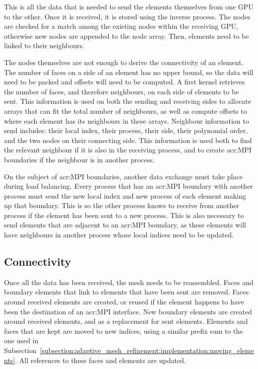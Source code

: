 This is all the data that is needed to send the elements themselves from one GPU to the other. Once
it is received, it is stored using the inverse process. The nodes are checked for a match among the
existing nodes within the receiving GPU, otherwise new nodes are appended to the node array. Then,
elements need to be linked to their neighbours. 

The nodes themselves are not enough to derive the connectivity of an element. The number of faces on
a side of an element has no upper bound, so the data will need to be packed and offsets will need to
be computed. A first kernel retrieves the number of faces, and therefore neighbours, on each side of
elements to be sent. This information is used on both the sending and receiving sides to allocate
arrays that can fit the total number of neighbours, as well as compute offsets to where each element
has its neighbours in these arrays. Neighbour information to send includes: their local index, their
process, their side, their polynomial order, and the two nodes on their connecting side. This
information is used both to find the relevant neighbour if it is also in the receiving process, and
to create \acrshort{acr:MPI} boundaries if the neighbour is in another process.

On the subject of \acrshort{acr:MPI} boundaries, another data exchange must take place during load
balancing. Every process that has an \acrshort{acr:MPI} boundary with another process must send the
new local index and new process of each element making up that boundary. This is so the other
process knows to receive from another process if the element has been sent to a new process. This is
also necessary to send elements that are adjacent to an \acrshort{acr:MPI} boundary, as these
elements will have neighbours in another process whose local indices need to be updated.

\subsection{Connectivity} \label{subsection:load_balancing:reconstruction:connectivity}

Once all the data has been received, the mesh needs to be reassembled. Faces and boundary elements
that link to elements that have been sent are removed. Faces around received elements are created,
or reused if the element happens to have been the destination of an \acrshort{acr:MPI} interface.
New boundary elements are created around received elements, and as a replacement for sent elements.
Elements and faces that are kept are moved to new indices, using a similar prefix sum to the one
used in Subsection~\ref{subsection:adaptive_mesh_refinement:implementation:moving_elements}. All
references to these faces and elements are updated.

